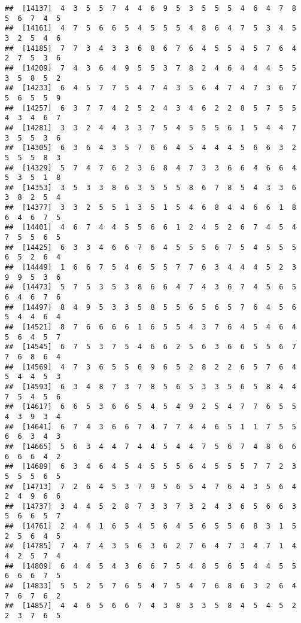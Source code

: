 \documentclass[
]{book}
\begin{document}
\begin{verbatim}
##  [14137]  4  3  5  5  7  4  4  6  9  5  3  5  5  5  4  6  4  7  8  5  6  7  4  5
##  [14161]  4  7  5  6  6  5  4  5  5  5  4  8  6  4  7  5  3  4  5  3  2  5  4  6
##  [14185]  7  7  3  4  3  3  6  8  6  7  6  4  5  5  4  5  7  6  4  2  7  5  3  6
##  [14209]  7  4  3  6  4  9  5  5  3  7  8  2  4  6  4  4  4  5  5  3  5  8  5  2
##  [14233]  6  4  5  7  7  5  4  7  4  3  5  6  4  7  4  7  3  6  7  5  6  5  5  9
##  [14257]  6  3  7  7  4  2  5  2  4  3  4  6  2  2  8  5  7  5  5  4  3  4  6  7
##  [14281]  3  3  2  4  4  3  3  7  5  4  5  5  5  6  1  5  4  4  7  3  5  5  3  6
##  [14305]  6  3  6  4  3  5  7  6  6  4  5  4  4  4  5  6  6  3  2  5  5  5  8  3
##  [14329]  5  7  4  7  6  2  3  6  8  4  7  3  3  6  6  4  6  6  4  5  3  5  1  8
##  [14353]  3  5  3  3  8  6  3  5  5  5  8  6  7  8  5  4  3  3  6  3  8  2  5  4
##  [14377]  3  3  2  5  5  1  3  5  1  5  4  6  8  4  4  6  6  1  8  6  4  6  7  5
##  [14401]  4  6  7  4  4  5  5  6  6  1  2  4  5  2  6  7  4  5  4  7  5  5  6  5
##  [14425]  6  3  3  4  6  6  7  6  4  5  5  5  6  7  5  4  5  5  5  6  5  2  6  4
##  [14449]  1  6  6  7  5  4  6  5  5  7  7  6  3  4  4  4  5  2  3  9  9  5  3  6
##  [14473]  5  7  5  3  5  3  8  6  6  4  7  4  3  6  7  4  5  6  5  6  4  6  7  6
##  [14497]  8  4  9  5  3  3  5  8  5  5  6  5  6  5  7  6  4  5  6  5  4  4  6  4
##  [14521]  8  7  6  6  6  6  1  6  5  5  4  3  7  6  4  5  4  6  4  5  6  4  5  7
##  [14545]  6  7  5  3  7  5  4  6  6  2  5  6  3  6  6  5  5  6  7  7  6  8  6  4
##  [14569]  4  7  3  6  5  5  6  9  6  5  2  8  2  2  6  5  7  6  4  5  4  4  5  3
##  [14593]  6  3  4  8  7  3  7  8  5  6  5  3  3  5  6  5  8  4  4  7  5  4  5  6
##  [14617]  6  6  5  3  6  6  5  4  5  4  9  2  5  4  7  7  6  5  5  4  3  9  3  4
##  [14641]  6  7  4  3  6  6  7  4  7  7  4  4  6  5  1  1  7  5  5  6  6  3  4  3
##  [14665]  5  6  3  4  4  7  4  4  5  4  4  7  5  6  7  4  8  6  6  6  6  6  4  2
##  [14689]  6  3  4  6  4  5  4  5  5  5  6  4  5  5  5  7  7  2  3  5  5  5  6  5
##  [14713]  7  2  6  4  5  3  7  9  5  6  5  4  7  6  4  3  5  6  4  2  4  9  6  6
##  [14737]  3  4  4  5  2  8  7  3  3  7  3  2  4  3  6  5  6  6  3  5  6  6  5  7
##  [14761]  2  4  4  1  6  5  4  5  6  4  5  6  5  5  6  8  3  1  5  2  5  6  4  5
##  [14785]  7  4  7  4  3  5  6  3  6  2  7  6  4  7  3  4  7  1  4  4  2  5  7  4
##  [14809]  6  4  4  5  4  3  6  6  7  5  4  8  5  6  5  4  4  5  5  6  6  6  7  5
##  [14833]  5  5  2  5  7  6  5  4  7  5  4  7  6  8  6  3  2  6  4  7  6  7  6  2
##  [14857]  4  4  6  5  6  6  7  4  3  8  3  3  5  8  4  5  4  5  2  2  3  7  6  5

\end{verbatim}
\end{document}
